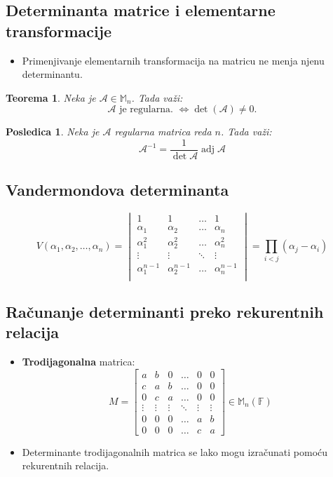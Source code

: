 \documentclass[a4paper,12pt,twoside]{report}
\newtheorem{theorem}{Teorema}[section]
\newtheorem{corollary}{Posledica}[theorem]
\numberwithin{algorithm}{section}
\begin{document}
\subsection{Determinanta matrice i elementarne transformacije}
\begin{itemize}
    \item Primenjivanje elementarnih transformacija na matricu ne menja njenu determinantu.
\end{itemize}

\begin{theorem}
    Neka je $\mathcal{A} \in \mathbb{M}_n$. Tada važi:\\
    \[\mathcal{A}\text{ je regularna. }\iff \operatorname{det}(\mathcal{A}) \neq 0.\]
\end{theorem}

\begin{corollary}
    Neka je $\mathcal{A}$ regularna matrica reda $n$. Tada važi:
\[ \mathcal{A}^{-1} = \frac{1}{\det \mathcal{A}} \operatorname{adj} \mathcal{A} \]
\end{corollary}

\subsection{Vandermondova determinanta}
\[ V(\alpha_1, \alpha_2, \dots, \alpha_n) = \begin{vmatrix}
    1 & 1 & \dots & 1 \\
    \alpha_1 & \alpha_2 & \dots & \alpha_n \\
    \alpha_1^2 & \alpha_2^2 & \dots & \alpha_n^2 \\
    \vdots & \vdots & \ddots & \vdots \\
    \alpha_1^{n-1} & \alpha_2^{n-1} & \dots & \alpha_n^{n-1} \\
\end{vmatrix} = \prod_{i < j} (\alpha_j - \alpha_i) \]

\subsection{Računanje determinanti preko rekurentnih relacija}
\begin{itemize}
    \item \textbf{Trodijagonalna} matrica:
    \[ M = \begin{bmatrix}
        a & b & 0 & \dots & 0 & 0 \\
        c & a & b & \dots & 0 & 0 \\
        0 & c & a & \dots & 0 & 0 \\
        \vdots & \vdots & \vdots & \ddots & \vdots & \vdots \\
        0 & 0 & 0 & \dots & a & b \\
        0 & 0 & 0 & \dots & c & a
    \end{bmatrix} \in \mathbb{M}_n(\mathbb{F})\]
    \item Determinante trodijagonalnih matrica se lako mogu izračunati pomoću rekurentnih relacija.
\end{itemize}
\newpage
\end{document}
